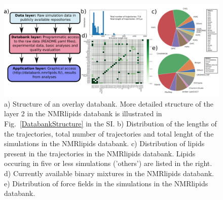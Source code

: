 \documentclass[fleqn,10pt]{wlscirep}
\begin{document}

\begin{figure}
    \centering
    \includegraphics[width = 180mm]{Figures/overlay2.pdf}
    \caption{a) Structure of an overlay databank. 
    More detailed structure of the layer 2 in the NMRlipids databank is illustrated in Fig.~\ref{DatabankStructure} in the SI.
    b) Distribution of the lengths of the trajectories, total number of trajectories and total lenght of the simulations in the NMRlipids databank.
    c) Distribution of lipids present in the trajectories in the NMRlipids databank. Lipids occuring in five or less simulations ('others') are listed in the right. 
    d) Currently available binary mixtures in the NMRlipids databank. 
    e) Distribution of force fields in the simulations in the NMRlipids databank.
    }
    \label{fig:overlay}
\end{figure}
\end{document}

